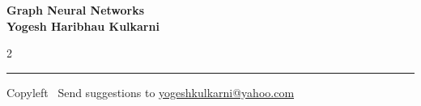 \documentclass[8pt,landscape]{article}
\begin{document}
\footnotesize


\begin{center}
\Large{\textbf{Graph Neural Networks\\ Yogesh Haribhau Kulkarni}}  
\end{center}

\begin{multicols}{2}

\end{multicols}

\rule{\linewidth}{0.25pt}
\scriptsize
Copyleft \textcopyleft\  Send suggestions to 
\href{http://www.yogeshkulkarni.com}{yogeshkulkarni@yahoo.com}
\end{document}
